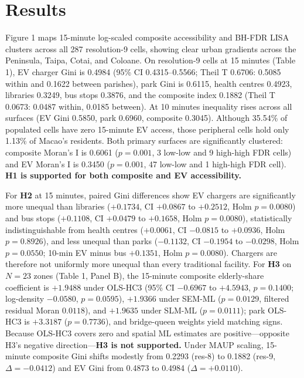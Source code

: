 \documentclass[11pt,a4paper]{article}
\begin{document}
\section{Results}
Figure 1 maps 15-minute log-scaled composite accessibility and BH-FDR LISA clusters across all 287 resolution-9 cells, showing clear urban gradients across the Peninsula, Taipa, Cotai, and Coloane. On resolution-9 cells at 15 minutes (Table 1), EV charger Gini is 0.4984 (95\% CI 0.4315--0.5566; Theil T 0.6706: 0.5085 within and 0.1622 between parishes), park Gini is 0.6115, health centres 0.4923, libraries 0.3249, bus stops 0.3876, and the composite index 0.1882 (Theil T 0.0673: 0.0487 within, 0.0185 between). At 10 minutes inequality rises across all surfaces (EV Gini 0.5850, park 0.6960, composite 0.3045). Although 35.54\% of populated cells have zero 15-minute EV access, those peripheral cells hold only 1.13\% of Macao's residents. Both primary surfaces are significantly clustered: composite Moran's I is 0.6061 (\(p=0.001\), 3 low-low and 9 high-high FDR cells) and EV Moran's I is 0.3450 (\(p=0.001\), 47 low-low and 1 high-high FDR cell). \textbf{H1 is supported for both composite and EV accessibility.}

For \textbf{H2} at 15 minutes, paired Gini differences show EV chargers are significantly more unequal than libraries (\(+0.1734\), CI \(+0.0867\) to \(+0.2512\), Holm \(p=0.0080\)) and bus stops (\(+0.1108\), CI \(+0.0479\) to \(+0.1658\), Holm \(p=0.0080\)), statistically indistinguishable from health centres (\(+0.0061\), CI \(-0.0815\) to \(+0.0936\), Holm \(p=0.8926\)), and less unequal than parks (\(-0.1132\), CI \(-0.1954\) to \(-0.0298\), Holm \(p=0.0550\); 10-min EV minus bus \(+0.1351\), Holm \(p=0.0080\)). Chargers are therefore not uniformly more unequal than every traditional facility. For \textbf{H3} on \(N=23\) zones (Table 1, Panel B), the 15-minute composite elderly-share coefficient is \(+1.9488\) under OLS-HC3 (95\% CI \(-0.6967\) to \(+4.5943\), \(p=0.1400\); log-density \(-0.0580\), \(p=0.0595\)), \(+1.9366\) under SEM-ML (\(p=0.0129\), filtered residual Moran \(0.0118\)), and \(+1.9635\) under SLM-ML (\(p=0.0111\)); park OLS-HC3 is \(+3.3187\) (\(p=0.7736\)), and bridge-queen weights yield matching signs. Because OLS-HC3 covers zero and spatial ML estimates are positive—opposite H3's negative direction—\textbf{H3 is not supported.} Under MAUP scaling, 15-minute composite Gini shifts modestly from 0.2293 (res-8) to 0.1882 (res-9, \(\Delta=-0.0412\)) and EV Gini from 0.4873 to 0.4984 (\(\Delta=+0.0110\)).
\end{document}
